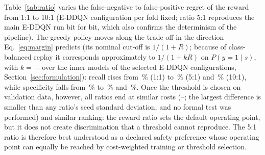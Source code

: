 Table~\ref{tab:ratio} varies the false-negative to false-positive regret of the reward from 1:1 to 10:1 (E-DDQN configuration per fold fixed; ratio 5:1 reproduces the main E-DDQN run bit for bit, which also confirms the determinism of the pipeline). The greedy policy moves along the trade-off in the direction Eq.~\eqref{eq:margin} predicts (its nominal cut-off is $1/(1+R)$; because of class-balanced replay it corresponds approximately to $1/(1+kR)$ on $P(y=1\mid s)$, with $k=$ \SSEDDQNKMin--\SSEDDQNKMax{} over the inner models of the selected E-DDQN configurations, Section~\ref{sec:formulation}): recall rises from \RatioArgOneRecall\,\% (1:1) to \RatioArgFiveRecall\,\% (5:1) and \RatioArgOneZeroRecall\,\% (10:1), while specificity falls from \RatioArgOneSpec\,\% to \RatioArgFiveSpec\,\% and \RatioArgOneZeroSpec\,\%. Once the threshold is chosen on validation data, however, all ratios end at similar costs (\RatioTunedOneCost--\RatioTunedOneZeroCost; the largest difference is smaller than any ratio's seed standard deviation, and no formal test was performed) and similar ranking: the reward ratio sets the default operating point, but it does not create discrimination that a threshold cannot reproduce. The 5:1 ratio is therefore best understood as a declared safety preference whose operating point can equally be reached by cost-weighted training or threshold selection.

\begin{table}[t]
\centering
\caption{Reward-ratio sensitivity of E-DDQN: operating point of the greedy (arg-max) policy, whose nominal cut-off is $1/(1+R)$ ($1/(1+kR)$ on $P(y=1\mid s)$ under class-balanced replay; Section~\ref{sec:formulation}), and of the validation-tuned threshold (rule D1). Mean ($\pm$ SD) over five seeds.}
\label{tab:ratio}
\footnotesize

\end{table}
